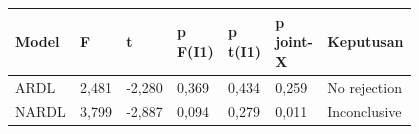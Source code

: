 {\small\setlength{\tabcolsep}{3pt}\renewcommand{\arraystretch}{1.15}
\begin{tabular}{p{0.1\linewidth}p{0.08\linewidth}p{0.08\linewidth}p{0.1\linewidth}p{0.1\linewidth}p{0.12\linewidth}p{0.22\linewidth}}
\toprule
\textbf{Model} & \textbf{F} & \textbf{t} & \textbf{p F(I1)} & \textbf{p t(I1)} & \textbf{p joint-X} & \textbf{Keputusan}\\
\midrule
ARDL & 2,481 & -2,280 & 0,369 & 0,434 & 0,259 & No rejection\\
NARDL & 3,799 & -2,887 & 0,094 & 0,279 & 0,011 & Inconclusive\\
\bottomrule
\end{tabular}
}